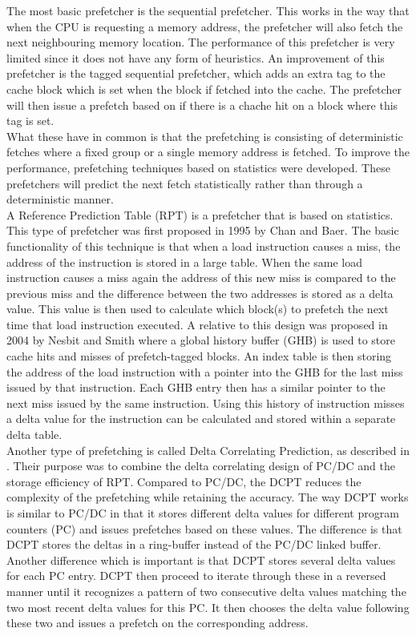 The most basic prefetcher is the sequential prefetcher. This works in the way that when the CPU is requesting a memory address, the prefetcher will also fetch the next neighbouring memory location. The performance of this prefetcher is very limited since it does not have any form of heuristics. An improvement of this prefetcher is the tagged sequential prefetcher, which adds an extra tag to the cache block which is set when the block if fetched into the cache. The prefetcher will then issue a prefetch based on if there is a chache hit on a block where this tag is set.\\
What these have in common is that the prefetching is consisting of deterministic fetches where a fixed group or a single memory address is fetched. To improve the performance, prefetching techniques based on statistics were developed. These prefetchers will predict the next fetch statistically rather than through a deterministic manner.\\
A Reference Prediction Table (RPT) is a prefetcher that is based on statistics. This type of prefetcher was first proposed in 1995 by Chan and Baer. The basic functionality of this technique is that when a load instruction causes a miss, the address of the instruction is stored in a large table. When the same load instruction causes a miss again the address of this new miss is compared to the previous miss and the difference between the two addresses is stored as a delta value. This value is then used to calculate which block(s) to prefetch the next time that load instruction executed. 
A relative to this design was proposed in 2004 by Nesbit and Smith where a global history buffer (GHB) is used to store cache hits and misses of prefetch-tagged blocks. An index table is then storing the address of the load instruction with a pointer into the GHB for the last miss issued by that instruction. Each GHB entry then has a similar pointer to the next miss issued by the same instruction. Using this history of instruction misses a delta value for the instruction can be calculated and stored within  a separate delta table.\\
Another type of prefetching is called Delta Correlating Prediction, as described in \cite{reference:jahre}. Their purpose was to combine the delta correlating design of PC/DC and the storage efficiency of RPT. Compared to PC/DC, the DCPT reduces the complexity of the prefetching while retaining the accuracy.
The way DCPT works is similar to PC/DC in that it stores different delta values for different program counters (PC) and issues prefetches based on these values. The difference is that DCPT stores the deltas in a ring-buffer instead of the PC/DC linked buffer. Another difference which is important is that DCPT stores several delta values for each PC entry. DCPT then proceed to iterate through these in a reversed manner until it recognizes a pattern of two consecutive delta values matching the two most recent delta values for this PC. It then chooses the delta value following these two and issues a prefetch on the corresponding address.
